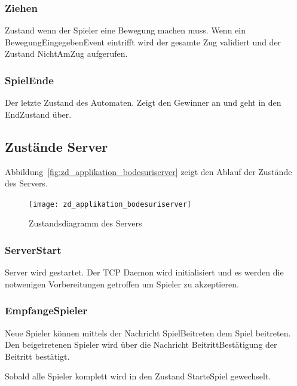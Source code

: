 \documentclass[12pt,halfparskip]{scrartcl}
\begin{document}
\subsubsection{Ziehen} %
\label{ssub:ziehen}
Zustand wenn der Spieler eine Bewegung machen muss. Wenn ein BewegungEingegebenEvent eintrifft wird der gesamte Zug validiert und der Zustand NichtAmZug aufgerufen.

\subsubsection{SpielEnde} %
\label{ssub:spielende}
Der letzte Zustand des Automaten. Zeigt den Gewinner an und geht in den EndZustand über.

\subsection{Zustände Server} %
\label{sub:zustände_server}

Abbildung~\vref{fig:zd_applikation_bodesuriserver} zeigt den Ablauf der Zustände des Servers.

\begin{figure}[h]
	\centering
	\texttt{[image: zd\_applikation\_bodesuriserver]}
	\caption{Zustandsdiagramm des Servers}
	\label{fig:zd_applikation_bodesuriserver}
\end{figure}

\subsubsection{ServerStart} %
\label{ssub:serverStart}
Server wird gestartet. Der TCP Daemon wird initialisiert und es werden die notwenigen Vorbereitungen getroffen um Spieler zu akzeptieren.


\subsubsection{EmpfangeSpieler} %
\label{ssub:empfangespieler}
Neue Spieler können mittels der Nachricht SpielBeitreten dem Spiel beitreten. Den beigetretenen Spieler wird über die Nachricht BeitrittBestätigung der Beitritt bestätigt.

Sobald alle Spieler komplett wird in den Zustand StarteSpiel gewechselt.

\end{document}

